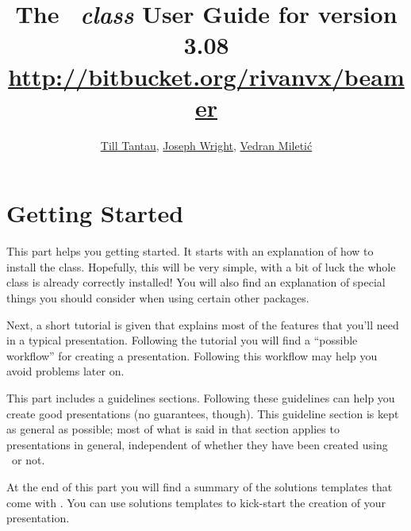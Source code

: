 \documentclass{ltxdoc}
\def\beamerugversion{3.08}
\begin{document}

\title{\Huge The \beamer\ \textit{class} User Guide for version \beamerugversion\\
\Large\url{http://bitbucket.org/rivanvx/beamer}}
\author{\href{mailto:tantau@users.sourceforge.net}{Till Tantau}, \href{joseph.wright@morningstar2.co.uk}{Joseph Wright}, \href{vmiletic@inf.uniri.hr}{Vedran Mileti\'c}}

\maketitle

\tableofcontents






\part{Getting Started}

This part helps you getting started. It starts with an explanation of how to install the class. Hopefully, this will be very simple, with a bit of luck the whole class is already correctly installed! You will also find an explanation of special things you should consider when using certain other packages.

Next, a short tutorial is given that explains most of the features that you'll need in a typical presentation. Following the tutorial you will find a ``possible workflow'' for creating a presentation. Following this workflow may help you avoid problems later on.

This part includes a guidelines sections. Following these guidelines can help you create good presentations (no guarantees, though). This guideline section is kept as general as possible; most of what is said in that section applies to presentations in general, independent of whether they have been created using \beamer\ or not.

At the end of this part you will find a summary of the solutions templates that come with \beamer. You can use solutions templates to kick-start the creation of your presentation.







\end{document}
